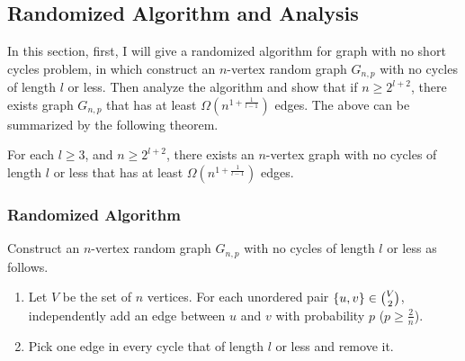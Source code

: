 \subsection {Randomized Algorithm and Analysis}
In this section, first, I will give a randomized algorithm for graph with no short cycles problem, in which construct an $n$-vertex random graph $G_{n,p}$ with no cycles of length $l$ or less. Then analyze the algorithm and show that if $n\ge 2^{l+2}$, there exists graph $G_{n,p}$ that has at least $\Omega (n^{1+\frac{1}{l-1}})$ edges. The above can be summarized by the following theorem.
\begin{theorem}
For each $l\ge 3$, and $n\ge 2^{l+2}$, there exists an $n$-vertex graph with no cycles of length $l$ or less that has at least $\Omega (n^{1+\frac{1}{l-1}})$ edges.
\end{theorem}
\subsubsection{Randomized Algorithm}
Construct an $n$-vertex random graph $G_{n,p}$ with no cycles of length $l$ or less as follows. 
\begin{enumerate}
    \item Let $V$ be the set of $n$ vertices. For each unordered pair $\{u,v\}\in \tbinom{V}{2}$, independently add an edge between $u$ and $v$ with probability $p$ ($p\ge \frac{2}{n}$).
    \item Pick one edge in every cycle that of length $l$ or less and remove it.
\end{enumerate}

